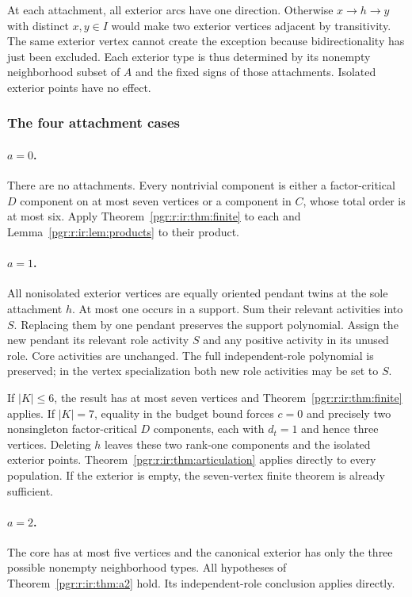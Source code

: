 \documentclass[11pt]{article}
\numberwithin{equation}{section}
\theoremstyle{definition}\newtheorem{definition}[theorem]{Definition}\newtheorem{remark}[theorem]{Remark}
\begin{document}
At each attachment, all exterior arcs have one direction. Otherwise $x\to h\to y$ with distinct $x,y\in I$ would make two exterior vertices adjacent by transitivity. The same exterior vertex cannot create the exception because bidirectionality has just been excluded. Each exterior type is thus determined by its nonempty neighborhood subset of $A$ and the fixed signs of those attachments. Isolated exterior points have no effect.

\subsubsection{The four attachment cases}
\paragraph{$a=0$.}
There are no attachments. Every nontrivial component is either a factor-critical $D$ component on at most seven vertices or a component in $C$, whose total order is at most six. Apply Theorem~\ref{pgr:r:ir:thm:finite} to each and Lemma~\ref{pgr:r:ir:lem:products} to their product.

\paragraph{$a=1$.}
All nonisolated exterior vertices are equally oriented pendant twins at the sole attachment $h$. At most one occurs in a support. Sum their relevant activities into $S$. Replacing them by one pendant preserves the support polynomial. Assign the new pendant its relevant role activity $S$ and any positive activity in its unused role. Core activities are unchanged. The full independent-role polynomial is preserved; in the vertex specialization both new role activities may be set to $S$.

If $|K|\le6$, the result has at most seven vertices and Theorem~\ref{pgr:r:ir:thm:finite} applies. If $|K|=7$, equality in the budget bound forces $c=0$ and precisely two nonsingleton factor-critical $D$ components, each with $d_t=1$ and hence three vertices. Deleting $h$ leaves these two rank-one components and the isolated exterior points. Theorem~\ref{pgr:r:ir:thm:articulation} applies directly to every population. If the exterior is empty, the seven-vertex finite theorem is already sufficient.

\paragraph{$a=2$.}
The core has at most five vertices and the canonical exterior has only the three possible nonempty neighborhood types. All hypotheses of Theorem~\ref{pgr:r:ir:thm:a2} hold. Its independent-role conclusion applies directly.
\end{document}
